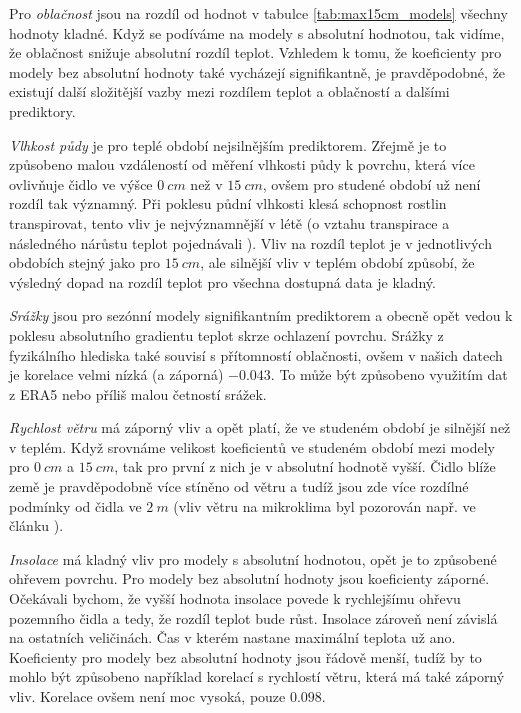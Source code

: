 Pro \textit{oblačnost} jsou na rozdíl od hodnot v tabulce \ref{tab:max15cm_models} všechny hodnoty kladné. Když se podíváme na modely s absolutní hodnotou, tak vidíme, že oblačnost snižuje absolutní rozdíl teplot. Vzhledem k tomu, že koeficienty pro modely bez absolutní hodnoty také vycházejí signifikantně, je pravděpodobné, že existují další složitější vazby mezi rozdílem teplot a oblačností a dalšími prediktory.

\textit{Vlhkost půdy} je pro teplé období nejsilnějším prediktorem. Zřejmě je to způsobeno malou vzdáleností od měření vlhkosti půdy k povrchu, která více ovlivňuje čidlo ve výšce $\SI{0}{cm}$ než v $\SI{15}{cm}$, ovšem pro studené období už není rozdíl tak významný. Při poklesu půdní vlhkosti klesá schopnost rostlin transpirovat, tento vliv je nejvýznamnější v létě (o vztahu transpirace a následného nárůstu teplot pojednávali \cite{snow_deFrenneForestMicroclimates}). Vliv na rozdíl teplot je v jednotlivých obdobích stejný jako pro $\SI{15}{cm}$, ale silnější vliv v teplém období způsobí, že výsledný dopad na rozdíl teplot pro všechna dostupná data je kladný.

\textit{Srážky} jsou pro sezónní modely signifikantním prediktorem a obecně opět vedou k poklesu absolutního gradientu teplot skrze ochlazení povrchu. Srážky z fyzikálního hlediska také souvisí s přítomností oblačnosti, ovšem v našich datech je korelace velmi nízká (a záporná) $-0.043$. To může být způsobeno využitím dat z ERA5 nebo příliš malou četností srážek.

\textit{Rychlost větru} má záporný vliv a opět platí, že ve studeném období je silnější než v teplém. Když srovnáme velikost koeficientů ve studeném období mezi modely pro $\SI{0}{cm}$ a $\SI{15}{cm}$, tak pro první z nich je v absolutní hodnotě vyšší. Čidlo blíže země je pravděpodobně více stíněno od větru a tudíž jsou zde více rozdílné podmínky od čidla ve $\SI{2}{m}$ (vliv větru na mikroklima byl pozorován např. ve článku \cite{wind_contrastingmicroclimates}). 

\textit{Insolace} má kladný vliv pro modely s absolutní hodnotou, opět je to způsobené ohřevem povrchu. Pro modely bez absolutní hodnoty jsou koeficienty záporné. Očekávali bychom, že vyšší hodnota insolace povede k rychlejšímu ohřevu pozemního čidla a tedy, že rozdíl teplot bude růst. Insolace zároveň není závislá na ostatních veličinách. Čas v kterém nastane maximální teplota už ano. Koeficienty pro modely bez absolutní hodnoty jsou řádově menší, tudíž by to mohlo být způsobeno například korelací s rychlostí větru, která má také záporný vliv. Korelace ovšem není moc vysoká, pouze $0.098$.


